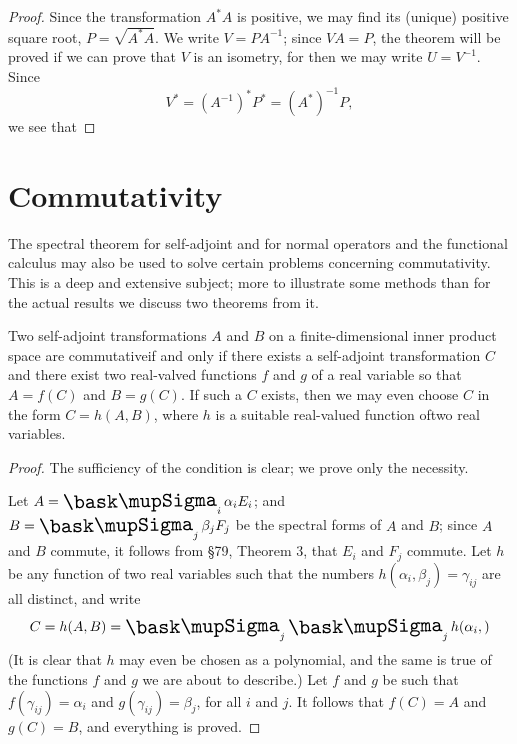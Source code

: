 {\begin{proof}
    Since the transformation \(A^*A\) is positive, we may find its (unique) positive
    square root, \(P = \sqrt{A^*A}\). We write \(V = PA^{-1}\); since \(VA = P\), the theorem will be
    proved if we can prove that \(V\) is an isometry, for then we may write \(U = V^{-1}\). Since
    \begin{equation}
        V^* = (A^{-1})^* P^* = (A^*)^{-1}P,
    \end{equation}
    we see that
\end{proof}

\section{Commutativity}

The spectral theorem for self-adjoint and for normal operators and the
functional calculus may also be used to solve certain problems concerning
commutativity. This is a deep and extensive subject; more to illustrate some
methods than for the actual results we discuss two theorems from it.

\begin{theorem}
    Two self-adjoint transformations \(A\) and \(B\) on a finite-dimensional
    inner product space are commutativeif and only if there exists a
    self-adjoint transformation \(C\) and there exist two real-valved functions
    \(f\) and \(g\) of a real variable so that \(A = f(C)\) and \(B = g(C)\). If
    such a \(C\) exists, then we may even choose \(C\) in the form \(C = h(A,
    B)\), where \(h\) is a suitable real-valued function oftwo real variables.
\end{theorem}

\begin{proof}
    The sufficiency of the condition is clear; we prove only the necessity.

    Let \(A = \sumx_i \alpha_i E_i\); and \(B = \sumx_j \beta_j F_j\) be the spectral forms of \(A\) and \(B\); since \(A\) and \(B\) commute, it follows from §79, Theorem 3, that \(E_i\) and \(F_j\) commute. Let \(h\) be any function of two real variables such that the numbers \(h(\alpha_i, \beta_j) = \gamma_{ij}\) are all distinct, and write
    \begin{equation*}
        C = h(A, B) = \sumx_j \sumx_j h(\alpha_i, )
    \end{equation*}
    (It is clear that \(h\) may even be chosen as a polynomial, and the same is true of the functions \(f\) and \(g\) we are about to describe.) Let \(f\) and \(g\) be such that \(f(\gamma_{ij}) = \alpha_i\) and \(g(\gamma_{ij}) = \beta_j\), for all \(i\) and \(j\). It follows that \(f(C) = A\) and \(g(C) = B\), and everything is proved.
\end{proof}

}
